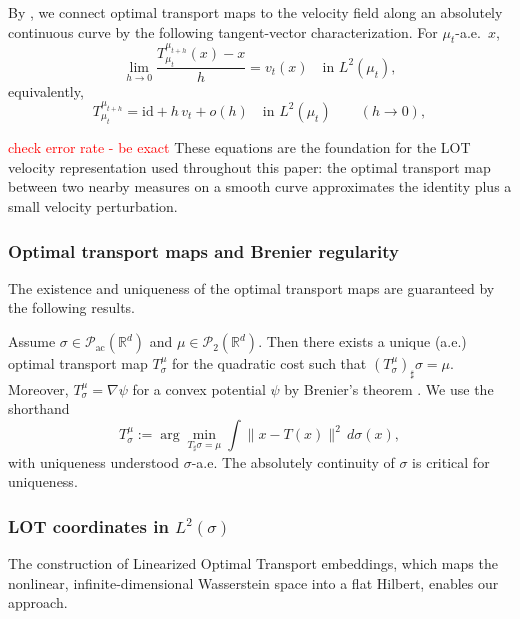 \documentclass[11pt]{article}
\newcommand{\R}{\mathbb{R}}
\newcommand{\1}{\mathbf{1}}
\begin{document}
By \cite[Theorem~8.3.1 and Proposition~8.4.6]{ambrosio2008gradient}, we connect optimal transport maps to the velocity field along an absolutely continuous curve by the following tangent-vector characterization. For $\mu_t$-a.e.\ $x$,
\begin{equation}\label{eq:local-transport-prelim}
\lim_{h\to 0}\frac{T_{\mu_t}^{\mu_{t+h}}(x)-x}{h}=v_t(x)
\quad\text{in }L^2(\mu_t),
\end{equation}
equivalently,
\begin{equation}\label{eq:euler-approx-prelim}
T_{\mu_t}^{\mu_{t+h}}=\mathrm{id}+h\,v_t+o(h)\quad\text{in }L^2(\mu_t)\qquad(h\to 0),
\end{equation}

\textcolor{red}{check error rate - be exact}
These equations are the foundation for the LOT velocity representation used throughout this paper: the optimal transport map between two nearby measures on a smooth curve approximates the identity plus a small velocity perturbation. 

\subsubsection*{Optimal transport maps and Brenier regularity}\label{sec:prelim-brenier}

The existence and uniqueness of the optimal transport maps are guaranteed by the following results. 

Assume $\sigma\in\mathcal{P}_{\mathrm{ac}}(\R^d)$ and $\mu\in\mathcal{P}_2(\R^d)$. Then there exists a unique (a.e.) optimal transport map $T_\sigma^\mu$ for the quadratic cost such that $(T_\sigma^\mu)_\sharp\sigma=\mu$.
Moreover, $T_\sigma^\mu=\nabla\psi$ for a convex potential $\psi$ by Brenier's theorem \cite{brenier-1991,villani2008optimal,mccann-2001,ambrosio-2013}. We use the shorthand
\[
T_\sigma^\mu := \arg\min_{T_\sharp\sigma=\mu}\int\|x-T(x)\|^2\,d\sigma(x),
\]
with uniqueness understood $\sigma$-a.e. The absolutely continuity of $\sigma$ is critical for uniqueness. 

\subsubsection*{LOT coordinates in $L^2(\sigma)$}\label{sec:lot-prelim}

The construction of Linearized Optimal Transport embeddings, which maps the nonlinear, infinite-dimensional Wasserstein space into a flat Hilbert, enables our approach. 
\end{document}
